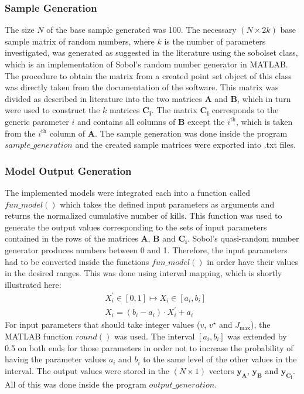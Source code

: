 \documentclass[11pt]{article}
\begin{document}
\subsubsection{Sample Generation}
The size $N$ of the base sample generated was 100. The necessary $(N \times 2k)$ base sample matrix of random numbers, where $k$ is the number of parameters investigated, was generated as suggested in the literature using the sobolset class, which is an implementation of Sobol's random number generator in MATLAB. The procedure to obtain the matrix from a created point set object of this class was directly taken from the documentation of the software. This matrix was divided as described in literature into the two matrices $\boldsymbol{A}$ and $\boldsymbol{B}$, which in turn were used to construct the $k$ matrices $\boldsymbol{C_i}$. The matrix $\boldsymbol{C_i}$ corresponds to the generic parameter $i$ and contains all columns of $\boldsymbol{B}$ except the $i^{\text{th}}$, which is taken from the $i^{\text{th}}$ column of $\boldsymbol{A}$. The sample generation was done inside the program $sample\_generation$ and the created sample matrices were exported into .txt files.

\subsubsection{Model Output Generation}
The implemented models were integrated each into a function called $fun\_model()$ which takes the defined input parameters as arguments and returns the normalized cumulative number of kills. This function was used to generate the output values corresponding to the sets of input parameters contained in the rows of the matrices $\boldsymbol{A}$, $\boldsymbol{B}$ and $\boldsymbol{C_i}$. Sobol's quasi-random number generator produces numbers between 0 and 1. Therefore, the input parameters had to be converted inside the functions $fun\_model()$ in order have their values in the desired ranges. This was done using interval mapping, which is shortly illustrated here:
\begin{align*}
& X_i^\prime \in [0,1] \longmapsto X_i \in [a_i,b_i]\\
&X_i = (b_i-a_i) \cdot X_i^\prime + a_i
\end{align*}
For input parameters that should take integer values ($v$, $v^\star$ and $J_\mathrm{max}$), the MATLAB function $round()$ was used. The interval $[a_i,b_i]$ was extended by 0.5 on both ends for those parameters in order not to increase the probability of having the parameter values $a_i$ and $b_i$ to the same level of the other values in the interval. The output values were stored in the $(N \times 1)$ vectors $\boldsymbol{y_A}$, $\boldsymbol{y_B}$ and $\boldsymbol{y_{C_i}}$. All of this was done inside the program $output\_generation$.
\end{document}
